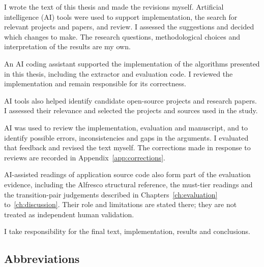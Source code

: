 \documentclass[english,12pt,a4paper,sci,utf8,a-2b,online]{aaltothesis}
\date{\today}
\numberwithin{table}{section}
\numberwithin{figure}{section}
\numberwithin{equation}{section}
\newcommand{\abspar}{}
\begin{document}
\makecoverpage

\begin{abstractpage}[english]
\let\abspar\par
\abstracttext
\end{abstractpage}

\dothesispagenumbering{}


I wrote the text of this thesis and made the revisions myself. Artificial intelligence (AI)
tools were used to support implementation, the search for relevant projects and papers, and
review. I assessed the suggestions and decided which changes to make. The research questions,
methodological choices and interpretation of the results are my own.

An AI coding assistant supported the implementation of the algorithms presented in this
thesis, including the extractor and evaluation code. I reviewed the implementation and remain
responsible for its correctness.

AI tools also helped identify candidate open-source projects and research papers. I assessed
their relevance and selected the projects and sources used in the study.

AI was used to review the implementation, evaluation and manuscript, and to identify possible
errors, inconsistencies and gaps in the arguments. I evaluated that feedback and revised the
text myself. The corrections made in response to reviews are recorded in
Appendix~\ref{app:corrections}.

AI-assisted readings of application source code also form part of the evaluation evidence,
including the Alfresco structural reference, the must-tier readings and the transition-pair
judgements described in Chapters~\ref{ch:evaluation} to~\ref{ch:discussion}. Their role and
limitations are stated there; they are not treated as independent human validation.

I take responsibility for the final text, implementation, results and conclusions.

\newpage
\thesistableofcontents


\subsection*{Abbreviations}
\end{document}
